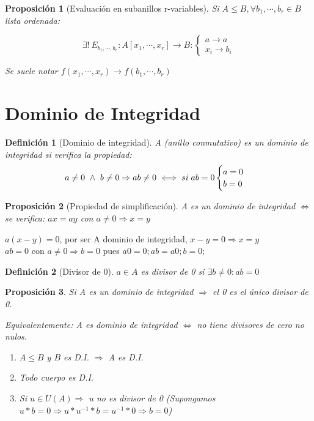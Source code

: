 \documentclass[11pt, a4paper, titlepage]{article}
\makeatletter
\renewenvironment{proof}[1][\proofname] {\vspace{-15pt}\par\pushQED{\qed}\normalfont\topsep6\p@\@plus6\p@\relax\trivlist\item[\hskip\labelsep\it#1\@addpunct{.}]\ignorespaces}{\popQED\endtrivlist\@endpefalse}
\theoremstyle{theorem-style}
\newtheorem*{nprop}{Proposición}
\theoremstyle{definition-style}
\newtheorem*{ndef}{Definición}
\theoremstyle{remark-style}
\theoremstyle{example-style}
\newenvironment{nlist}
{\begin{enumerate}
\renewcommand\labelenumi{(\emph{\roman{enumi})}}}
{\end{enumerate}}
\makeatother
\begin{document}
\begin{nprop}[Evaluación en subanillos r-variables]
	Si $A\leq B, \forall b_1,\cdots,b_r \in B$ lista ordenada:
	
\[
\exists !\ E_{b_1,\cdots,b_r}: A[x_1,\cdots,x_r] \to B :
\begin{cases}
	a \to a\\
	x_i \to b_i
\end{cases}
\]

Se suele notar $f(x_1,\cdots,x_r) \to f(b_1,\cdots,b_r)$
\end{nprop}

\section{Dominio de Integridad}

\begin{ndef}[Dominio de integridad]
A (anillo conmutativo) es un dominio de integridad si verifica la propiedad:
\[
a \neq 0\ \wedge\ b \neq 0 \Rightarrow ab \neq 0 \iff si \hspace{0.1cm} ab=0 \begin{cases}
	a = 0\\
	b = 0
\end{cases}
\]
	
\end{ndef}

\begin{nprop}[Propiedad de simplificación]
	
A es un dominio de integridad $\iff$ se verifica: $ax=ay$ con $a\neq 0 \Rightarrow x = y$
\end{nprop}
\begin{proof}
	\boxed{\Rightarrow} $a(x-y) = 0$, por ser A dominio de integridad, $x-y = 0 \Rightarrow x=y$ \\
	\boxed{\Leftarrow} $ab = 0$ con $a\neq 0 \Rightarrow b= 0$ pues $a0 = 0; ab = a0; b = 0;$
\end{proof}

\begin{ndef}[Divisor de 0]
	$a\in A$ es divisor de 0 si $\exists b\neq 0 : ab = 0$
\end{ndef}

\begin{nprop}
	Si A es un dominio de integridad $\Rightarrow$ el 0 es el único divisor de 0.
	
	Equivalentemente: A es dominio de integridad $\iff$ no tiene divisores de cero no nulos.
\begin{nlist}
	\item $A\leq B$ y $B$ es D.I. $\Rightarrow$ A es D.I.
	\item Todo cuerpo es D.I.
	\item Si $u \in U(A) \Rightarrow$ u no es divisor de 0 (Supongamos $u*b = 0 \Rightarrow u*u^{-1}*b = u^{-1}*0 \Rightarrow b=0$)
\end{nlist}
\end{nprop}
\end{document}
